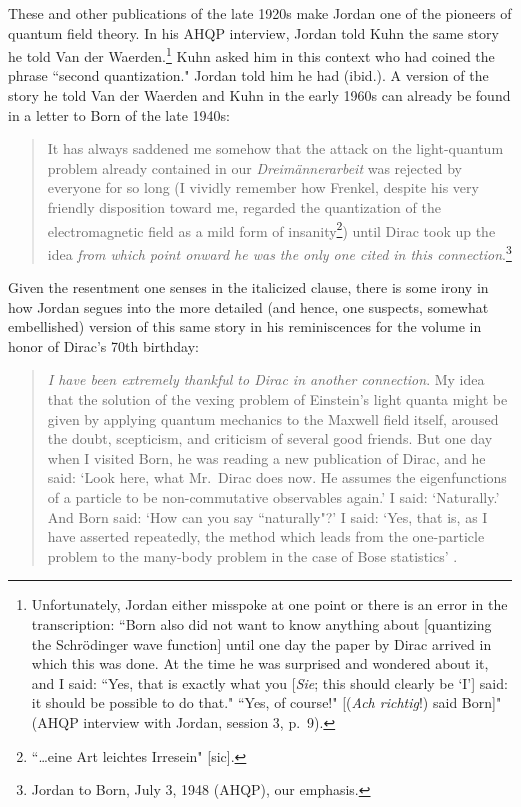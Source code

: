 \documentclass[12pt]{elsart}
\begin{document}
These and other publications of the late 1920s make Jordan one of the pioneers of quantum field theory. In his AHQP interview, Jordan told Kuhn the same story he told Van der Waerden.\footnote{Unfortunately, Jordan either misspoke at one point or there is an error in the transcription: ``Born also did not want to know anything about [quantizing the Schr\"odinger wave function] until one day the paper by Dirac arrived in which this was done. At the time he was surprised and wondered about it, and I said: ``Yes, that is exactly what you [{\it Sie}; this should clearly be `I'] said: it should be possible to do that." ``Yes, of course!" [({\it Ach richtig}!) said Born]" (AHQP interview with Jordan, session 3, p.\ 9).} Kuhn asked him in this context who had coined the phrase ``second quantization." Jordan told him he had (ibid.).  A version of the story he told Van der Waerden and Kuhn in the early 1960s can already be found in a letter to Born of the late 1940s:
\begin{quotation}
It has always saddened me somehow that the attack on the light-quantum problem already contained in our {\it Dreim\"annerarbeit} was rejected by everyone for so long (I vividly remember how Frenkel, despite his very friendly disposition toward me, regarded the quantization of the electromagnetic field as a mild form of insanity\footnote{``\ldots eine Art leichtes Irresein" [sic].}) until Dirac took up the idea {\it from which point onward he was the only one cited in this connection}.\footnote{Jordan to Born, July 3, 1948 (AHQP), our emphasis.}
\end{quotation}
Given the resentment one senses in the italicized clause, there is some irony in how Jordan segues into the more detailed (and hence, one suspects, somewhat embellished) version of this same story in his reminiscences for the volume in honor of Dirac's 70th birthday:
\begin{quotation}
{\it I have been extremely thankful to Dirac in another connection}. My idea that the solution of the vexing problem of Einstein's light quanta might be given by applying quantum mechanics to the Maxwell field itself, aroused the doubt, scepticism, and criticism of several good friends. But one day when I visited Born, he was reading a new publication of Dirac, and he said: `Look here, what Mr.\ Dirac does now. He assumes the eigenfunctions of a particle to be non-commutative observables again.' I said: `Naturally.' And Born said: `How can you say ``naturally"?' I said: `Yes, that is, as I have asserted repeatedly, the method which leads from the one-particle problem to the many-body problem in the case of Bose statistics' \citep[p.\ 297; our emphasis]{Jordan 1973}.
\end{quotation}
\end{document}

